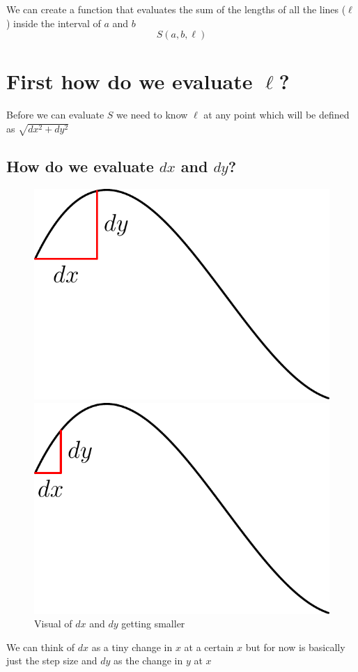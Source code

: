 \documentclass[12pt]{book}
\begin{document}
We can create a function that evaluates the sum of the lengths of all the lines ($\ell$) inside the interval of $a$ and $b$
$$S(a,b,\ell)$$

\section{First how do we evaluate $\ell$?}
Before we can evaluate $S$ we need to know $\ell$ at any point which will be defined as $\sqrt{dx^2 + dy^2}$ 
\subsection{How do we evaluate $dx$ and $dy$?}

\begin{figure}[h]
	\centering
	\begin{minipage}{0.45\textwidth} %
		\centering
		\includegraphics[width=\textwidth]{./figures/2.4.1.pdf}
	\end{minipage}
	\hfill
	\begin{minipage}{0.45\textwidth} %
		\centering
		\includegraphics[width=\textwidth]{./figures/2.4.pdf}
	\end{minipage}
	\caption{Visual of $dx$ and $dy$ getting smaller}
\end{figure}
We can think of $dx$ as a tiny change in $x$ at a certain $x$ but for now is basically just the step size and $dy$ as the change in $y$ at $x$
\end{document}
